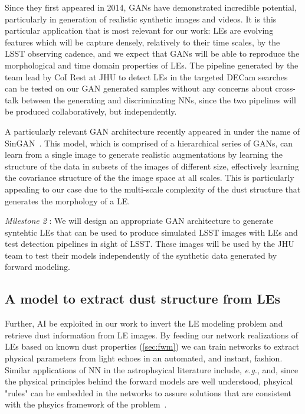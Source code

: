 \documentclass{proposalnsf}
\newcommand{\eg}{\emph{e.g.}}
\begin{document}
Since they first appeared in 2014, GANs have demonstrated incredible potential, particularly in  generation of realistic synthetic images and videos. It is this particular application that is most relevant for our work: LEs are evolving features which will be capture densely, relatively to their time scales, by the LSST observing cadence,  and we expect that GANs will be able to reproduce the morphological and time domain properties of LEs. The pipeline generated by the team lead by CoI Rest at JHU to detect LEs in the targeted DECam searches can be tested on our GAN generated samples without any concerns about cross-talk between the generating and discriminating NNs, since the two pipelines will be produced collaboratively, but independently.

A particularly relevant GAN architecture recently appeared in under the name of SinGAN~\citep{shaham2019singan}. This model, which is comprised of a hierarchical series of GANs, can learn from a single image to generate realistic augmentations by learning the structure of the data in subsets of the images of different size, effectively learning the covariance structure of the the image space at all scales. This is particularly appealing to our case due to the multi-scale complexity of the dust structure that generates the morphology of a LE.

\emph{Milestone 2} : We will design an appropriate GAN architecture to generate syntehtic LEs that can be used to produce simulated LSST images with LEs and test detection pipelines in sight of LSST. These images will be used by the JHU team to test their models independently of the synthetic data generated by forward modeling.

\subsection{A model to extract dust structure from LEs}

Further, AI be exploited in our work to invert the LE modeling problem and retrieve dust information from LE images. By feeding our network realizations of LEs based on known dust properties (\autoref{sec:fwm}) we can train networks to extract physical parameters from light echoes in an automated, and instant, fashion. Similar applications of NN in the astrophsyical literature include, \eg \citep{chen2019}, and, since the physical principles behind the forward models are well understood, phsyical "rules" can be embedded in the networks to assure solutions that are consistent with the phsyics framework of the problem~\citep{mattheakis2019}. 
\end{document}
